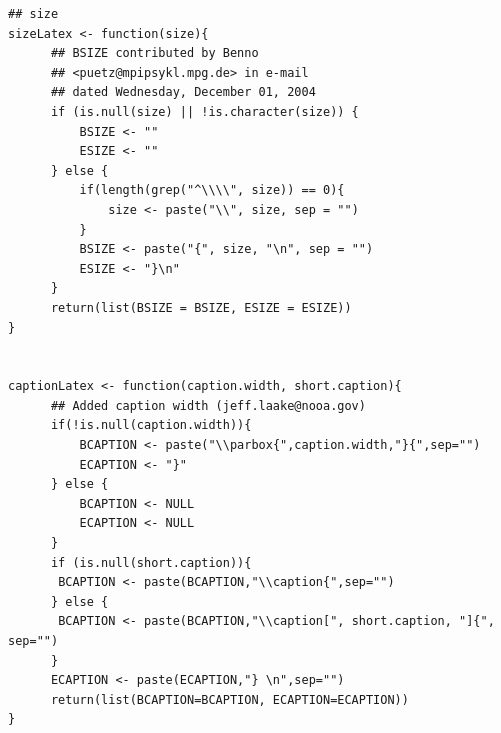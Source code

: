 \documentclass{memoir}\usepackage[]{graphicx}\usepackage[]{color}
\begin{document}
\begin{lstlisting}
## size
sizeLatex <- function(size){
      ## BSIZE contributed by Benno 
      ## <puetz@mpipsykl.mpg.de> in e-mail
      ## dated Wednesday, December 01, 2004
      if (is.null(size) || !is.character(size)) {
          BSIZE <- ""
          ESIZE <- ""
      } else {
          if(length(grep("^\\\\", size)) == 0){
              size <- paste("\\", size, sep = "")
          }
          BSIZE <- paste("{", size, "\n", sep = "")
          ESIZE <- "}\n"
      }
      return(list(BSIZE = BSIZE, ESIZE = ESIZE))
}


captionLatex <- function(caption.width, short.caption){
      ## Added caption width (jeff.laake@nooa.gov)
      if(!is.null(caption.width)){
          BCAPTION <- paste("\\parbox{",caption.width,"}{",sep="")
          ECAPTION <- "}"
      } else {
          BCAPTION <- NULL
          ECAPTION <- NULL
      }
      if (is.null(short.caption)){
       BCAPTION <- paste(BCAPTION,"\\caption{",sep="")
      } else {
       BCAPTION <- paste(BCAPTION,"\\caption[", short.caption, "]{", sep="")
      }
      ECAPTION <- paste(ECAPTION,"} \n",sep="")
      return(list(BCAPTION=BCAPTION, ECAPTION=ECAPTION))
}
\end{lstlisting}
\end{document}
